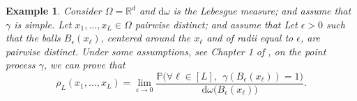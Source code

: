 \documentclass[twoside,11pt]{book}
\newtheorem{definition}{Definition}
\newtheorem{example}{Example}
\numberwithin{theorem}{chapter}
\numberwithin{definition}{chapter}
\numberwithin{proposition}{chapter}
\numberwithin{corollary}{chapter}
\numberwithin{example}{chapter}
\numberwithin{lemma}{chapter}
\begin{document}



\begin{example}
Consider $\Omega = \mathbb{R}^{d}$ and $\mathrm{d}\omega$ is the Lebesgue measure; and assume that $\gamma$ is simple. Let $x_{1}, \dots ,x_{L} \in \Omega$ pairwise distinct; and assume that  Let $\epsilon >0$ such that the balls $B_{\epsilon}(x_{\ell})$, centered around the $x_\ell$ and of radii equal to $\epsilon$, are pairwise distinct. Under some assumptions, see Chapter 1 of \citep*{HoKrPeVi09}, on the point process $\gamma$, we can prove that 
\begin{equation}
\rho_L(x_{1}, \dots, x_L) = \lim\limits_{ \epsilon \rightarrow 0} \frac{\mathbb{P}\bigg(\forall \ell \in [L], \:\: \gamma(B_{\epsilon}(x_{\ell})) = 1 \bigg)}{\mathrm{d}\omega \bigg(B_{\epsilon}(x_{\ell}) \bigg)}.
\end{equation}
\end{example}




\end{document}
